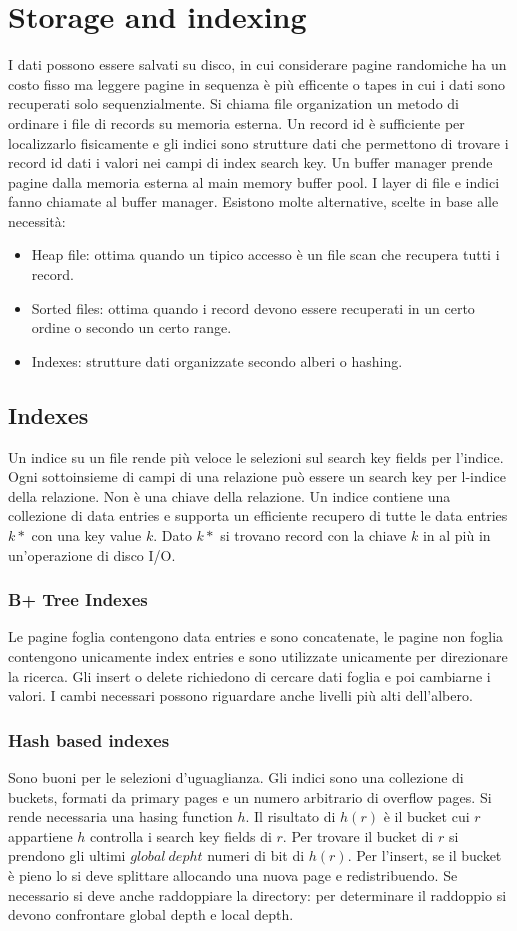 \chapter{Storage and indexing}
I dati possono essere salvati su disco, in cui considerare pagine randomiche ha un costo fisso ma leggere pagine in sequenza \`e pi\`u efficente o tapes
in cui i dati sono recuperati solo sequenzialmente. Si chiama file organization un metodo di ordinare i file di records su memoria esterna. Un record id
\`e sufficiente per localizzarlo fisicamente e gli indici sono strutture dati che permettono di trovare i record id dati i valori nei campi di index search
key. Un buffer manager prende pagine dalla memoria esterna al main memory buffer pool. I layer di file e indici fanno chiamate al buffer manager. Esistono 
molte alternative, scelte in base alle necessit\`a:
\begin{itemize}
\item Heap file: ottima quando un tipico accesso \`e un file scan che recupera tutti i record.
\item Sorted files: ottima quando i record devono essere recuperati in un certo ordine o secondo un certo range. 
\item Indexes: strutture dati organizzate secondo alberi o hashing. 
\end{itemize}
\section{Indexes}
Un indice su un file rende pi\`u veloce le selezioni sul search key fields per l'indice. Ogni sottoinsieme di campi di una relazione pu\`o essere un search
key per l-indice della relazione. Non \`e una chiave della relazione. Un indice contiene una collezione di data entries e supporta un efficiente recupero di
tutte le data entries $k*$ con una key value $k$. Dato $k*$ si trovano record con la chiave $k$ in al pi\`u in un'operazione di disco I/O. 
\subsection{B+ Tree Indexes}
Le pagine foglia contengono data entries e sono concatenate, le pagine non foglia contengono unicamente index entries e sono utilizzate unicamente per 
direzionare la ricerca. Gli insert o delete richiedono di cercare dati foglia e poi cambiarne i valori. I cambi necessari possono riguardare anche
livelli pi\`u alti dell'albero. 
\subsection{Hash based indexes}
Sono buoni per le selezioni d'uguaglianza. Gli indici sono una collezione di buckets, formati da primary pages e un numero arbitrario di overflow pages. Si rende 
necessaria una hasing function $h$. Il risultato di $h(r)$ \`e il bucket cui $r$ appartiene $h$ controlla i search key fields di $r$. Per trovare il bucket di $r$ si 
prendono gli ultimi $global\ depht$ numeri di bit di $h(r)$. Per l'insert, se il bucket \`e pieno lo si deve splittare allocando una nuova page e 
redistribuendo. Se necessario si deve anche raddoppiare la directory: per determinare il raddoppio si devono confrontare global depth e local depth. 
